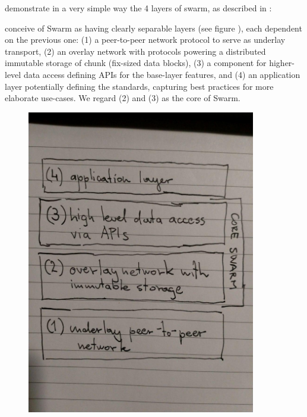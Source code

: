 \documentclass[a4paper,12pt,fullpage,openany,hyperfootnotes,hidelinks]{scrbook}
\begin{document}

demonstrate in a very simple way the 4 layers of swarm, as described in : 

conceive of Swarm as having clearly separable layers (see figure ), each dependent on the previous one: (1) a peer-to-peer network protocol to serve as underlay transport, (2) an overlay network with protocols powering a distributed immutable storage of chunk (fix-sized data blocks), (3) a component for higher-level data access defining APIs for the base-layer features, and (4) an application layer potentially defining the standards, capturing best practices for more elaborate use-cases. We regard (2) and (3) as the core of Swarm.


\begin{figure}[htp]
    \centering
    \includegraphics[width=10cm]{fig-drafts/swarm-layered-design.jpg}
\end{figure}


\end{document}
